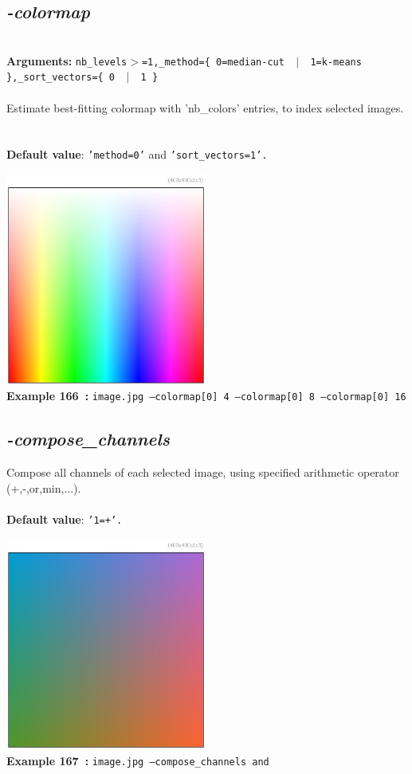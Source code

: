 \documentclass[a4paper,11pt,twoside]{book}
\begin{document}
\subsection{\emph{-colormap} }\vspace*{-0.5em}
~\\\textbf{Arguments: } 
{\small \texttt{nb\_levels$>$=1,\_method=\{ 0=median-cut ~$|$~ 1=k-means \},\_sort\_vectors=\{ 0 ~$|$~ 1 \}}}\\~\\
Estimate best-fitting colormap with 'nb\_colors' entries, to index selected images.
~\\~\\\textbf{Default value}: {\small \texttt{'method=0'} and \texttt{'sort\_vectors=1'.}}
\begin{center}\includegraphics[keepaspectratio=true,height=7cm,width=\textwidth]{img/gmic_def166.jpg}\\
{\footnotesize \textbf{Example 166~:} \texttt{image.jpg --colormap[0] 4 --colormap[0] 8 --colormap[0] 16}}
\end{center}

\subsection{\emph{-compose\_channels} }\vspace*{-0.5em}
Compose all channels of each selected image, using specified arithmetic operator (+,-,or,min,...).
~\\~\\\textbf{Default value}: {\small \texttt{'1=+'.}}
\begin{center}\includegraphics[keepaspectratio=true,height=7cm,width=\textwidth]{img/gmic_def167.jpg}\\
{\footnotesize \textbf{Example 167~:} \texttt{image.jpg --compose\_channels and}}
\end{center}
\end{document}

